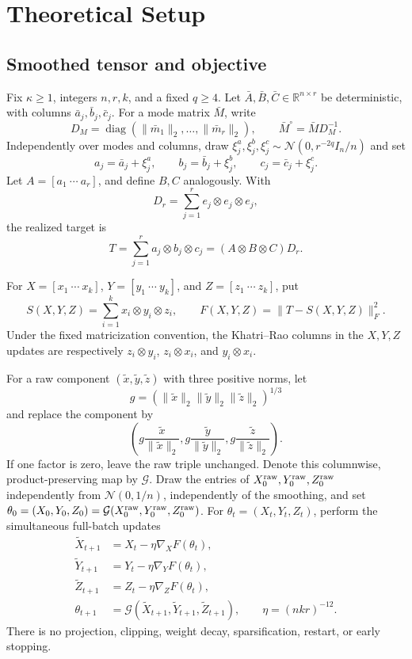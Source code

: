 \section{Theoretical Setup}\label{sec:setup}

\subsection{Smoothed tensor and objective}

Fix $\kappa\geq 1$, integers $n,r,k$, and a fixed $q\geq4$.  Let
$\bar A,\bar B,\bar C\in\mathbb R^{n\times r}$ be deterministic, with
columns $\bar a_j,\bar b_j,\bar c_j$.  For a mode matrix $\bar M$, write
\[
  D_M=\operatorname{diag}(\|\bar m_1\|_2,\ldots,\|\bar m_r\|_2),
  \qquad \bar M^\circ=\bar M D_M^{-1}.
\]
Independently over modes and columns, draw
$\xi_j^a,\xi_j^b,\xi_j^c\sim\mathcal N(0,r^{-2q}I_n/n)$ and set
\[
  a_j=\bar a_j+\xi_j^a,\qquad
  b_j=\bar b_j+\xi_j^b,\qquad
  c_j=\bar c_j+\xi_j^c.
\]
Let $A=[a_1\ \cdots\ a_r]$, and define $B,C$ analogously.  With
\[
  D_r=\sum_{j=1}^r e_j\otimes e_j\otimes e_j,
\]
the realized target is
\[
  T=\sum_{j=1}^r a_j\otimes b_j\otimes c_j
   =(A\otimes B\otimes C)D_r.
\]

For $X=[x_1\ \cdots\ x_k]$, $Y=[y_1\ \cdots\ y_k]$, and
$Z=[z_1\ \cdots\ z_k]$, put
\[
  S(X,Y,Z)=\sum_{i=1}^k x_i\otimes y_i\otimes z_i,
  \qquad F(X,Y,Z)=\|T-S(X,Y,Z)\|_F^2.
\]
Under the fixed matricization convention, the Khatri--Rao columns in the
$X,Y,Z$ updates are respectively $z_i\otimes y_i$, $z_i\otimes x_i$, and
$y_i\otimes x_i$.

For a raw component $(\widetilde x,\widetilde y,\widetilde z)$ with three
positive norms, let
\[
  g=(\|\widetilde x\|_2\|\widetilde y\|_2
       \|\widetilde z\|_2)^{1/3}
\]
and replace the component by
\[
  \left(g\frac{\widetilde x}{\|\widetilde x\|_2},
        g\frac{\widetilde y}{\|\widetilde y\|_2},
        g\frac{\widetilde z}{\|\widetilde z\|_2}\right).
\]
If one factor is zero, leave the raw triple unchanged.  Denote this
columnwise, product-preserving map by $\mathcal G$.  Draw the entries of
$X_0^{\rm raw},Y_0^{\rm raw},Z_0^{\rm raw}$ independently from
$\mathcal N(0,1/n)$, independently of the smoothing, and set
$\theta_0=(X_0,Y_0,Z_0)=\mathcal G(X_0^{\rm raw},Y_0^{\rm raw},Z_0^{\rm raw})$.
For $\theta_t=(X_t,Y_t,Z_t)$, perform the simultaneous full-batch updates
\[
\begin{aligned}
  \widetilde X_{t+1}&=X_t-\eta\nabla_XF(\theta_t),\\
  \widetilde Y_{t+1}&=Y_t-\eta\nabla_YF(\theta_t),\\
  \widetilde Z_{t+1}&=Z_t-\eta\nabla_ZF(\theta_t),\\
  \theta_{t+1}&=\mathcal G(\widetilde X_{t+1},
       \widetilde Y_{t+1},\widetilde Z_{t+1}),
  \qquad \eta=(nkr)^{-12}.
\end{aligned}
\]
There is no projection, clipping, weight decay, sparsification, restart, or
early stopping.

